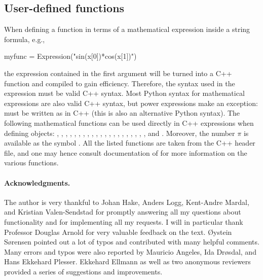 \subsection{User-defined functions}
\label{langtangen:app:cpp:functions}


When defining a function in terms of a mathematical expression inside
a string formula, e.g.,
\begin{python}
myfunc = Expression("sin(x[0])*cos(x[1])")
\end{python}
the expression contained in the first argument will be turned into a C++
function and compiled to gain efficiency. Therefore, the syntax used
in the expression must be valid C++ syntax.  Most Python syntax for
mathematical expressions are also valid C++ syntax, but power expressions
make an exception:  must be written as 
in C++ (this is also an alternative Python syntax).  The following
mathematical functions can be used directly in C++ expressions when
defining  objects: , , ,
, , , , , ,
, , , , , ,
, , , , , ,
and .  Moreover, the number $\pi$ is available as the symbol
.  All the listed functions are taken from the  C++
header file, and one may hence consult documentation of 
for more information on the various functions.

\paragraph{Acknowledgments.}

The author is very thankful to Johan Hake, Anders Logg, Kent-Andre
Mardal, and Kristian Valen-Sendstad for promptly answering all my
questions about \fenics{} functionality and for implementing all my
requests. I will in particular thank Professor Douglas Arnold for very
valuable feedback on the text. {\O}ystein S{\o}rensen pointed out a lot
of typos and contributed with many helpful comments.  Many errors and
typos were also reported by Mauricio Angeles, Ida Dr{\o}sdal, and Hans
Ekkehard Plesser. Ekkehard Ellmann as well as two anonymous reviewers
provided a series of suggestions and improvements.
